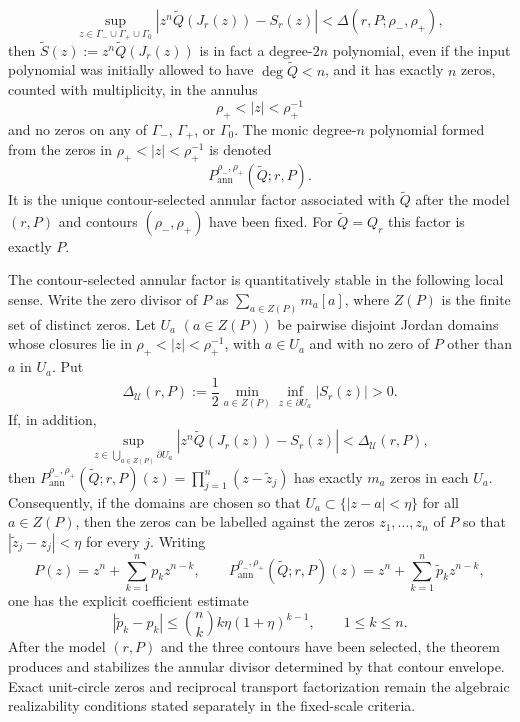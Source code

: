 \begin{theorem}
\[
\sup_{z\in\Gamma_-\cup\Gamma_+\cup\Gamma_0}
\left|z^n\widetilde Q(J_r(z))-S_r(z)\right|<\Delta(r,P;\rho_-,\rho_+),
\]
then \(\widetilde S(z):=z^n\widetilde Q(J_r(z))\) is in fact a degree-\(2n\) polynomial, even if the input polynomial was initially allowed to have \(\deg\widetilde Q<n\), and it has exactly \(n\) zeros, counted with multiplicity, in the annulus
\[
\rho_+<|z|<\rho_+^{-1}
\]
and no zeros on any of \(\Gamma_-\), \(\Gamma_+\), or \(\Gamma_0\).  The monic degree-\(n\) polynomial formed from the zeros in \(\rho_+<|z|<\rho_+^{-1}\) is denoted
\[
P_{\mathrm{ann}}^{\rho_-,\rho_+}(\widetilde Q;r,P).
\]
It is the unique contour-selected annular factor associated with \(\widetilde Q\) after the model \((r,P)\) and contours \((\rho_-,\rho_+)\) have been fixed.  For \(\widetilde Q=Q_r\) this factor is exactly \(P\).

The contour-selected annular factor is quantitatively stable in the following local sense.  Write the zero divisor of \(P\) as \(\sum_{a\in Z(P)}m_a[a]\), where \(Z(P)\) is the finite set of distinct zeros.  Let \(U_a\) \((a\in Z(P))\) be pairwise disjoint Jordan domains whose closures lie in \(\rho_+<|z|<\rho_+^{-1}\), with \(a\in U_a\) and with no zero of \(P\) other than \(a\) in \(U_a\).  Put
\[
\Delta_{\mathcal U}(r,P)
:=\frac12\min_{a\in Z(P)}\inf_{z\in\partial U_a}|S_r(z)|>0.
\]
If, in addition,
\[
\sup_{z\in\bigcup_{a\in Z(P)}\partial U_a}
\left|z^n\widetilde Q(J_r(z))-S_r(z)\right|<\Delta_{\mathcal U}(r,P),
\]
then \(P_{\mathrm{ann}}^{\rho_-,\rho_+}(\widetilde Q;r,P)(z)=\prod_{j=1}^{n}(z-\widetilde z_j)\) has exactly \(m_a\) zeros in each \(U_a\).  Consequently, if the domains are chosen so that \(U_a\subset\{|z-a|<\eta\}\) for all \(a\in Z(P)\), then the zeros can be labelled against the zeros \(z_1,\dots,z_n\) of \(P\) so that \(|\widetilde z_j-z_j|<\eta\) for every \(j\).  Writing
\[
P(z)=z^n+\sum_{k=1}^{n}p_k z^{n-k},
\qquad
P_{\mathrm{ann}}^{\rho_-,\rho_+}(\widetilde Q;r,P)(z)=z^n+\sum_{k=1}^{n}\widetilde p_k z^{n-k},
\]
one has the explicit coefficient estimate
\[
|\widetilde p_k-p_k|
\le \binom{n}{k}k\eta(1+\eta)^{k-1},
\qquad 1\le k\le n.
\]
After the model \((r,P)\) and the three contours have been selected, the theorem produces and stabilizes the annular divisor determined by that contour envelope.  Exact unit-circle zeros and reciprocal transport factorization remain the algebraic realizability conditions stated separately in the fixed-scale criteria.
\end{theorem}

